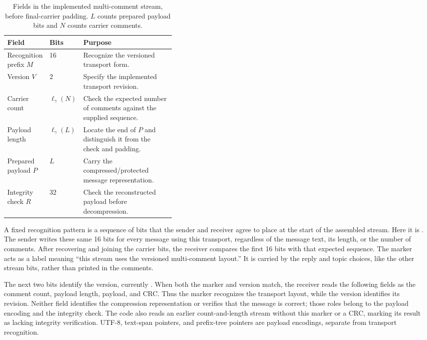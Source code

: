 \begin{table}[!htbp]
\centering\small
\caption{Fields in the implemented multi-comment stream, before final-carrier padding. $L$ counts prepared payload bits and $N$ counts carrier comments.}
\label{tab:multicomment-fields}
\begin{tabularx}{\linewidth}{|p{0.24\linewidth}|p{0.16\linewidth}|X|}
\hline
Field & Bits & Purpose \\ \hline
Recognition prefix $M$ & 16 & Recognize the versioned transport form. \\ \hline
Version $V$ & 2 & Specify the implemented transport revision. \\ \hline
Carrier count & $\ell_\gamma(N)$ & Check the expected number of comments against the supplied sequence. \\ \hline
Payload length & $\ell_\gamma(L)$ & Locate the end of $P$ and distinguish it from the check and padding. \\ \hline
Prepared payload $P$ & $L$ & Carry the compressed/protected message representation. \\ \hline
Integrity check $R$ & 32 & Check the reconstructed payload before decompression. \\ \hline
\end{tabularx}
\end{table}

A fixed recognition pattern is a sequence of bits that the sender and receiver agree to place at the start of the assembled stream. Here it is \texttt{\McMarkerString}. The sender writes these same 16 bits for every message using this transport, regardless of the message text, its length, or the number of comments. After recovering and joining the carrier bits, the receiver compares the first 16 bits with that expected sequence. The marker acts as a label meaning ``this stream uses the versioned multi-comment layout.'' It is carried by the reply and topic choices, like the other stream bits, rather than printed in the comments.

The next two bits identify the version, currently \texttt{\McVersionString}. When both the marker and version match, the receiver reads the following fields as the comment count, payload length, payload, and CRC. Thus the marker recognizes the transport layout, while the version identifies its revision. Neither field identifies the compression representation or verifies that the message is correct; those roles belong to the payload encoding and the integrity check. The code also reads an earlier count-and-length stream without this marker or a CRC, marking its result as lacking integrity verification. UTF-8, text-span pointers, and prefix-tree pointers are payload encodings, separate from transport recognition.

